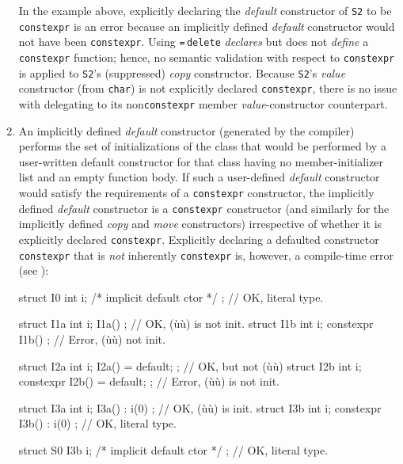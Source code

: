 \begin{enumerate}
{\noindent In the example above, explicitly declaring the \emph{default}
constructor of \lstinline!S2! to be \lstinline!constexpr! is an error because
an implicitly defined \emph{default} constructor would not have been
\lstinline!constexpr!. Using \lstinline!=!\,\lstinline!delete! \emph{declares} but
does not \emph{define} a \lstinline!constexpr! function; hence, no semantic
validation with respect to \lstinline!constexpr! is applied to
\lstinline!S2!'s (suppressed) \emph{copy} constructor. Because
\lstinline!S2!'s \emph{value} constructor (from \lstinline!char!) is not
explicitly declared \lstinline!constexpr!, there is no issue with
delegating to its non\lstinline!constexpr! member \emph{value}-constructor
counterpart.}

\item{An implicitly defined \emph{default} constructor (generated by the compiler) performs the set of initializations of the class that would be performed by a user-written default constructor for that class having no member-initializer list and an empty function body. If such a user-defined \emph{default} constructor would satisfy the requirements of a \lstinline!constexpr! constructor, the implicitly defined \emph{default} constructor is a \lstinline!constexpr! constructor (and similarly for the implicitly defined \emph{copy} and \emph{move} constructors) irrespective of whether it is explicitly declared \lstinline!constexpr!. Explicitly declaring a defaulted constructor \lstinline!constexpr! that is \emph{not} inherently \lstinline!constexpr! is, however, a compile-time error (see ):

\begin{emcppslisting}
struct I0  { int i; /* implicit default ctor */ };  // OK, literal type.

struct I1a { int i;            I1a()        { } };  // OK, (ù{}ù) is not init.
struct I1b { int i;  constexpr I1b()        { } };  // Error, (ù{}ù) not init.

struct I2a { int i;            I2a() = default; };  // OK, but not (ù{}ù)
struct I2b { int i;  constexpr I2b() = default; };  // Error, (ù{}ù) is not init.

struct I3a { int i;            I3a() : i(0) { } };  // OK, (ù{}ù) is init.
struct I3b { int i;  constexpr I3b() : i(0) { } };  // OK, literal type.

struct S0  { I3b i; /* implicit default ctor */ };  // OK, literal type.


\end{emcppslisting}}
\end{enumerate}
